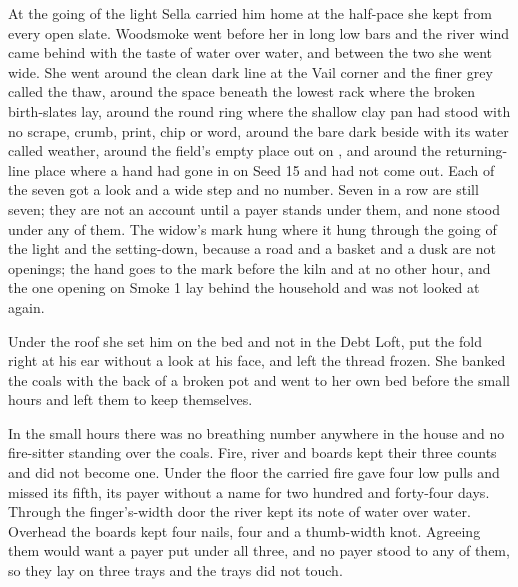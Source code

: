 \scenebreak

At the going of the light Sella carried him home at the half-pace she kept from every open slate. Woodsmoke went before her in long low bars and the river wind came behind with the taste of water over water, and between the two she went wide. She went around the clean dark line at the Vail corner and the finer grey called the thaw, around the space beneath the lowest rack where the broken birth-slates lay, around the round ring where the shallow clay pan had stood with no scrape, crumb, print, chip or word, around the bare dark  beside  with its water called weather, around the field's empty place out on , and around the returning-line place where a hand had gone in on Seed 15 and had not come out. Each of the seven got a look and a wide step and no number. Seven in a row are still seven; they are not an account until a payer stands under them, and none stood under any of them. The widow's mark hung where it hung through the going of the light and the setting-down, because a road and a basket and a dusk are not openings; the hand goes to the mark before the kiln and at no other hour, and the one opening on Smoke 1 lay behind the household and was not looked at again.

Under the roof she set him on the bed and not in the Debt Loft, put the fold right at his ear without a look at his face, and left the thread frozen. She banked the coals with the back of a broken pot and went to her own bed before the small hours and left them to keep themselves.

In the small hours there was no breathing number anywhere in the house and no fire-sitter standing over the coals. Fire, river and boards kept their three counts and did not become one. Under the floor the carried fire gave four low pulls and missed its fifth, its payer without a name for two hundred and forty-four days. Through the finger's-width door the river kept its note of water over water. Overhead the boards kept four nails, four and a thumb-width knot. Agreeing them would want a payer put under all three, and no payer stood to any of them, so they lay on three trays and the trays did not touch.

